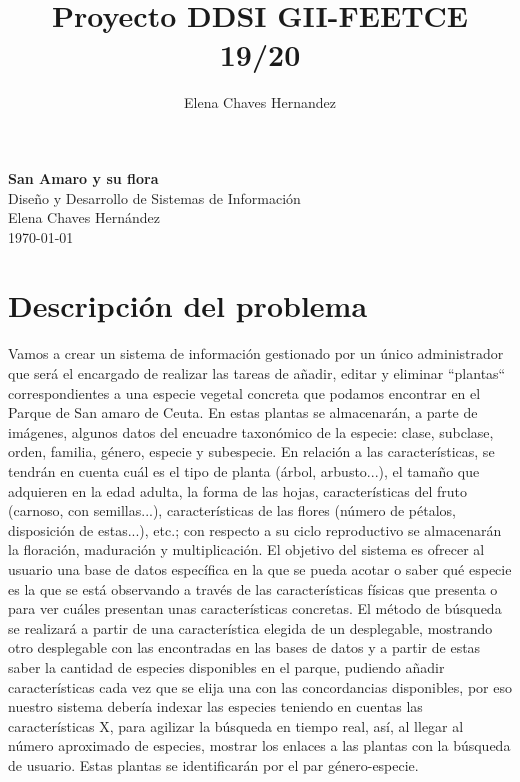 \documentclass[10pt,a4paper]{article}
\author{Elena Chaves Hernandez}
\title{Proyecto DDSI GII-FEETCE 19/20}
\begin{document}
\renewcommand{\contentsname}{Contenidos}
\renewcommand{\refname}{Bibliografía}

\begin{titlepage}
\thispagestyle{empty}
\setlength{\unitlength}{1cm}
\vspace*{\fill}

\begin{center}
\textbf{{\Huge San Amaro y su flora}}\\\vspace{7.5cm}
{\Large Diseño y Desarrollo de Sistemas de Información}\\\vspace{1cm}
{\Large Elena Chaves Hernández}\\\vspace{1cm}
\today \vspace{1cm}

\begin{figure} [h!]
\end{figure}
\end{center}
\end{titlepage}

\newpage
\tableofcontents
\thispagestyle{empty} 
\newpage

\section{\textbf{Descripción del problema}}  
Vamos a crear un sistema de información gestionado por un único administrador que será el encargado de realizar las tareas de añadir, editar y eliminar “plantas“ correspondientes a una especie vegetal concreta que podamos encontrar en el Parque de San amaro de Ceuta. En estas plantas se almacenarán, a parte de imágenes, algunos datos  del encuadre taxonómico de la especie: clase, subclase, orden, familia, género, especie y subespecie.  En relación a las características, se tendrán en cuenta cuál es el tipo de planta (árbol, arbusto...), el tamaño que adquieren en la edad adulta,  la forma de las hojas, características del fruto (carnoso, con semillas...), características de las flores (número de pétalos, disposición de estas...), etc.; con respecto a su ciclo reproductivo se almacenarán la floración, maduración y multiplicación. El objetivo del sistema es ofrecer al usuario una base de datos específica en la que se pueda acotar o saber qué especie es la que se está observando a través de las características físicas que presenta o para ver cuáles presentan unas características concretas. El método de búsqueda se realizará a partir de una característica elegida de un desplegable, mostrando otro desplegable con las encontradas en las bases de datos y a partir de estas saber la cantidad de especies disponibles en el parque, pudiendo añadir características cada vez que se elija una con las concordancias disponibles, por eso nuestro sistema debería indexar las especies teniendo en cuentas las características X, para agilizar la búsqueda en tiempo real, así, al llegar al número aproximado de especies, mostrar los enlaces a las plantas con la búsqueda de usuario. Estas plantas se identificarán por el par género-especie.
\newpage
\end{document}
